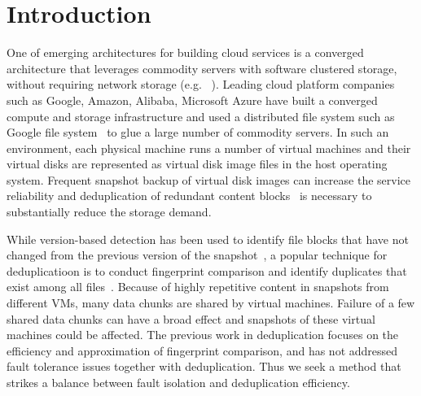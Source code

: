 \section{Introduction}

One of emerging architectures for building cloud services
is a converged architecture that leverages commodity servers with software clustered storage, without 
requiring network storage (e.g. ~\cite{NutanixPaper}). 
Leading cloud platform companies such as Google, Amazon, Alibaba,
Microsoft Azure  have built a converged compute and storage infrastructure and used
a distributed file system such as Google file system~\cite{googlefs03,hdfs10}
to glue a large number of commodity servers.
In such an environment,
each physical machine runs a number  of virtual machines 
and their  virtual disks are represented as virtual disk image files in the host operating system.
Frequent  snapshot backup of virtual disk images  can increase  the service reliability
and deduplication of redundant content blocks~\cite{venti02,bottleneck08}
 is necessary to substantially reduce the storage demand.
 

While version-based detection  has been used to  identify file  blocks that have not 
changed from the previous version of the snapshot~\cite{Clements2009,Vrable2009,TanIPDPS2011},
a popular technique for deduplicatioon is to 
conduct fingerprint  comparison and identify duplicates that exist
among all files~\cite{Guo2011,Dong2011,extreme_binning09}. 
Because of highly repetitive content in snapshots from different VMs,
many data chunks are shared by virtual machines.  
Failure of a few shared data chunks can have a 
broad effect and snapshots of these virtual machines could be affected.
The previous work in deduplication focuses on the efficiency and approximation of
fingerprint comparison, and has not addressed fault tolerance issues  together with deduplication.
Thus we seek a method that strikes a balance between fault isolation and deduplication efficiency.


